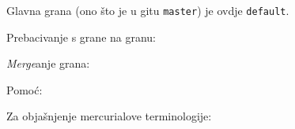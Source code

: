 Glavna grana (ono što je u gitu \verb+master+) je ovdje \verb+default+.

Prebacivanje s grane na granu:


\emph{Merge}anje grana:


Pomoć:


Za objašnjenje mercurialove terminologije:


